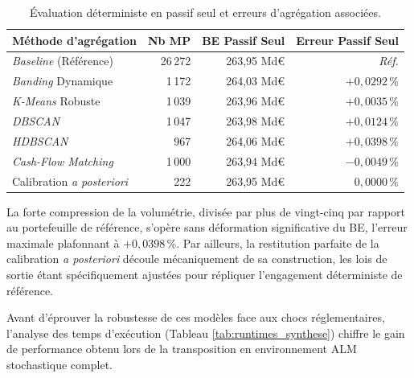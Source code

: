 \begin{table}[H]
    \centering
    \renewcommand{\arraystretch}{1.4}
    \begin{tabular}{|l|r|r|r|}
        \hline
        \textbf{Méthode d'agrégation} & \textbf{Nb MP} & \textbf{BE Passif Seul} & \textbf{Erreur Passif Seul} \\
        \hline
        \textit{Baseline} (Référence) & 26\,272 & 263{,}95 Md\euro{} & \textit{Réf.} \\
        \textit{Banding} Dynamique & 1\,172 & 264{,}03 Md\euro{} & $+0{,}0292\,\%$ \\
        \textit{K-Means} Robuste & 1\,039 & 263{,}96 Md\euro{} & $+0{,}0035\,\%$ \\
        \textit{DBSCAN} & 1\,047 & 263{,}98 Md\euro{} & $+0{,}0124\,\%$ \\
        \textit{HDBSCAN} & 967 & 264{,}06 Md\euro{} & $+0{,}0398\,\%$ \\
        \textit{Cash-Flow Matching} & 1\,000 & 263{,}94 Md\euro{} & $-0{,}0049\,\%$ \\
        Calibration \textit{a posteriori} & 222 & 263{,}95 Md\euro{} & $0{,}0000\,\%$ \\
        \hline
    \end{tabular}
    \caption{Évaluation déterministe en passif seul et erreurs d'agrégation associées.}
    \label{tab:synthese_calibration_finale_synthese}
\end{table}

La forte compression de la volumétrie, divisée par plus de vingt-cinq par rapport au portefeuille de référence, s'opère sans déformation significative du BE, l'erreur maximale plafonnant à $+0{,}0398\,\%$. Par ailleurs, la restitution parfaite de la calibration \textit{a posteriori} découle mécaniquement de sa construction, les lois de sortie étant spécifiquement ajustées pour répliquer l'engagement déterministe de référence.

Avant d'éprouver la robustesse de ces modèles face aux chocs réglementaires, l'analyse des temps d'exécution (Tableau \ref{tab:runtimes_synthese}) chiffre le gain de performance obtenu lors de la transposition en environnement ALM stochastique complet.

